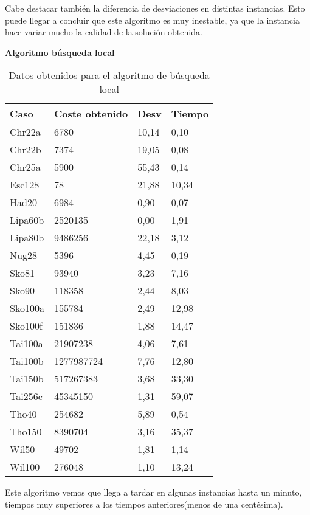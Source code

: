 Cabe destacar también la diferencia de desviaciones en distintas instancias. Esto puede llegar a concluir que este algoritmo es muy inestable, ya que la instancia hace variar mucho la calidad de la solución obtenida.

\newpage


\textbf{Algoritmo búsqueda local}
\begin{table}[htbp]
	\begin{center}
		\begin{tabular}{|l|l|l|l|}
			\hline
			Caso & Coste obtenido & Desv & Tiempo\\
			\hline \hline
			Chr22a& 6780& 10,14& 0,10\\ \hline
			Chr22b& 7374& 19,05& 0,08\\ \hline
			Chr25a& 5900& 55,43& 0,14\\ \hline
			Esc128& 78& 21,88& 10,34\\ \hline
			Had20& 6984& 0,90& 0,07\\ \hline
			Lipa60b& 2520135& 0,00& 1,91\\ \hline
			Lipa80b& 9486256& 22,18& 3,12\\ \hline
			Nug28& 5396& 4,45& 0,19\\ \hline
			Sko81& 93940& 3,23& 7,16\\ \hline
			Sko90& 118358& 2,44& 8,03\\ \hline
			Sko100a& 155784& 2,49& 12,98\\ \hline
			Sko100f& 151836& 1,88& 14,47\\ \hline
			Tai100a& 21907238& 4,06& 7,61\\ \hline
			Tai100b& 1277987724& 7,76& 12,80\\ \hline
			Tai150b& 517267383& 3,68& 33,30\\ \hline
			Tai256c& 45345150& 1,31& 59,07\\ \hline
			Tho40& 254682& 5,89& 0,54\\ \hline
			Tho150& 8390704& 3,16& 35,37\\ \hline
			Wil50& 49702& 1,81& 1,14\\ \hline
			Wil100& 276048& 1,10& 13,24\\ \hline
		\end{tabular}
		\caption{Datos obtenidos para el algoritmo de búsqueda local}
		\label{tabla:DatosBL-DLB}
	\end{center}
\end{table}

Este algoritmo vemos que llega a tardar en algunas instancias hasta un minuto, tiempos muy superiores a los tiempos anteriores(menos de una centésima).\\


